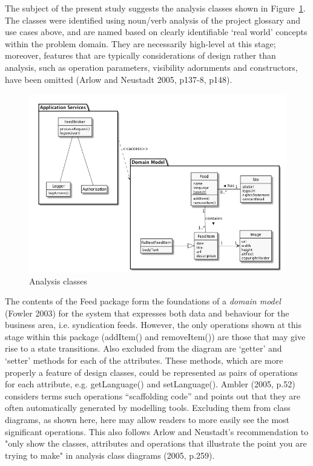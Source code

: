 \documentclass[a4paper]{article}
\begin{document}
The subject of the present study suggests the analysis classes shown in Figure~\ref{analysis-classes-diagram}. The classes were identified using noun/verb analysis of the project glossary and use cases above, and are named based on clearly identifiable `real world' concepts within the problem domain. They are necessarily high-level at this stage; moreover, features that are typically considerations of design rather than analysis, such as operation parameters, visibility adornments and constructors, have been omitted (Arlow and Neustadt 2005, p137-8, p148).

\begin{figure}
  \begin{center}
    \includegraphics[width=\textwidth]{analysis-classes.png}
  \end{center}
  \caption{Analysis classes}
  \label{analysis-classes-diagram}
\end{figure}

The contents of the \textsf{Feed} package form the foundations of a \textit{domain model} (Fowler 2003) for the system that expresses both data and behaviour for the business area, i.e. syndication feeds. However, the only operations shown at this stage within this package (\textsf{addItem()} and \textsf{removeItem()}) are those that may give rise to a state transitions. Also excluded from the diagram are `getter' and `setter' methods for each of the attributes. These methods, which are more properly a feature of design classes, could be represented as pairs of operations for each attribute, e.g. \textsf{getLanguage()} and \textsf{setLanguage()}. Ambler (2005, p.52) considers terms such operations ``scaffolding code'' and points out that they are often automatically generated by modelling tools. Excluding them from class diagrams, as shown here, here may allow readers to more easily see the most significant operations. This also follows Arlow and Neustadt's recommendation to "only show the classes, attributes and operations that illustrate the point you are trying to make" in analysis class diagrams (2005, p.259).
\end{document}
